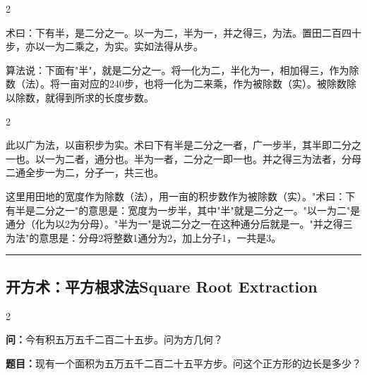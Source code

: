\documentclass[11pt,a4paper]{article}
\newcommand{\longline}{\noindent\rule{\textwidth}{0.4pt}}
\newcommand{\bilingualsubsection}[2]{%
  \subsection{#1\hfill\normalfont\normalsize\color{sectioncolor}#2}%
}
\begin{document}
\vspace{0.2cm}

\begin{paracol}{2}

\begin{methodbox}[\CJKfamily{rm}术 · 原文]
术曰：下有半，是二分之一。以一为二，半为一，并之得三，为法。置田二百四十步，亦以一为二乘之，为实。实如法得从步。
\end{methodbox}

\switchcolumn

\begin{methodbox}
算法说：下面有"半"，就是二分之一。将一化为二，半化为一，相加得三，作为除数（法）。将一亩对应的240步，也将一化为二来乘，作为被除数（实）。被除数除以除数，就得到所求的长度步数。
\end{methodbox}

\end{paracol}

\vspace{0.2cm}

\begin{paracol}{2}

\begin{commentarybox}
此以广为法，以亩积步为实。术曰下有半是二分之一者，广一步半，其半即二分之一也。以一为二者，通分也。半为一者，二分之一即一也。并之得三为法者，分母二通全步一为二，分子一，共三也。
\end{commentarybox}

\switchcolumn

\begin{commentarybox}
这里用田地的宽度作为除数（法），用一亩的积步数作为被除数（实）。"术曰：下有半是二分之一"的意思是：宽度为一步半，其中"半"就是二分之一。"以一为二"是通分（化为以2为分母）。"半为一"是说二分之一在这种通分后就是一。"并之得三为法"的意思是：分母2将整数1通分为2，加上分子1，一共是3。
\end{commentarybox}

\end{paracol}

\vspace{0.5cm}
\longline
\vspace{0.3cm}

\bilingualsubsection{开方术：平方根求法}{Square Root Extraction}

\begin{paracol}{2}

\begin{problembox}[\CJKfamily{rm}开方 · 原文]
\textbf{问：}今有积五万五千二百二十五步。问为方几何？
\end{problembox}

\switchcolumn

\begin{problembox}
\textbf{题目：}现有一个面积为五万五千二百二十五平方步。问这个正方形的边长是多少？
\end{problembox}

\end{paracol}
\end{document}
